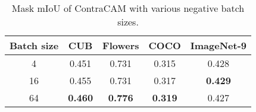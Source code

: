 \begin{table}[h]
\centering\small
\caption{
Mask mIoU of ContraCAM with various negative batch sizes.
}\label{tab:loc-batch}
\begin{tabular}{ccccc}
\toprule
Batch size & CUB & Flowers & COCO & ImageNet-9 \\
\midrule
4  & 0.451 & 0.731 & 0.315 & 0.428 \\
16 & 0.455 & 0.731 & 0.317 & \textbf{0.429} \\
64 & \textbf{0.460} & \textbf{0.776} & \textbf{0.319} & 0.427 \\
\bottomrule
\end{tabular}
\end{table}
